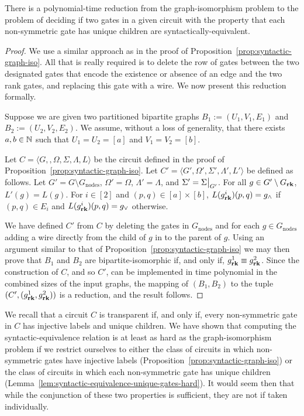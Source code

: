\documentclass[../paper.tex]{subfiles}
\begin{document}
\begin{lem}
  There is a polynomial-time reduction from the graph-isomorphism problem to the
  problem of deciding if two gates in a given circuit with the property that
  each non-symmetric gate has unique children are syntactically-equivalent.
  \label{lem:syntactic-equivalence-unique-gates-hard}
\end{lem}
\begin{proof}
  We use a similar approach as in the proof of
  Proposition~\ref{prop:syntactic-graph-iso}. All that is really required is to
  delete the row of gates between the two designated gates that encode the
  existence or absence of an edge and the two rank gates, and replacing this
  gate with a wire. We now present this reduction formally.
  
  Suppose we are given two partitioned bipartite graphs $B_1 := (U_1, V_1, E_1)$
  and $B_2 := (U_2, V_2, E_2)$. We assume, without a loss of generality, that
  there exists $a, b \in \mathbb{N}$ such that $U_1 = U_2 = [a]$ and $V_1 = V_2 =
  [b]$.

  Let $C = \langle G, , \Omega, \Sigma, \Lambda, L \rangle$ be the circuit
  defined in the proof of Proposition~\ref{prop:syntactic-graph-iso}. Let $C' =
  \langle G', \Omega', \Sigma', \Lambda', L'\rangle$ be defined as follows. Let
  $G' = G \setminus G_{\text{nodes}}$, $\Omega' = \Omega$, $\Lambda' = \Lambda$,
  and $\Sigma' = \restr{\Sigma}{G'}$. For all $g \in G' \setminus G_{\text{\textbf{rk}}}$,
  $L'(g) = L(g)$. For $i \in [2]$ and $(p,q) \in [a] \times [b]$,
  $L(g^i_{\text{\textbf{rk}}})(p,q) = g_{\land}$ if $(p,q) \in E_i$ and $L(g^i_{\text{\textbf{rk}}})(p,q)
  = g_{\lor}$ otherwise.

  We have defined $C'$ from $C$ by deleting the gates in $G_{\text{nodes}}$ and
  for each $g \in G_{\text{nodes}}$ adding a wire directly from the child of $g$
  in to the parent of $g$. Using an argument similar to that of
  Proposition~\ref{prop:syntactic-graph-iso} we may then prove that $B_1$ and
  $B_2$ are bipartite-isomorphic if, and only if, $g^1_{\text{\textbf{rk}}} \equiv
  g^2_{\text{\textbf{rk}}}$. Since the construction of $C$, and so $C'$, can be implemented
  in time polynomial in the combined sizes of the input graphs, the mapping of
  $(B_1, B_2)$ to the tuple $(C', (g^1_{\text{\textbf{rk}}}, g^2_{\text{\textbf{rk}}}))$ is a reduction,
  and the result follows.
\end{proof}

We recall that a circuit $C$ is transparent if, and only if, every non-symmetric
gate in $C$ has injective labels and unique children. We have shown that
computing the syntactic-equivalence relation is at least as hard as the
graph-isomorphism problem if we restrict ourselves to either the class of
circuits in which non-symmetric gates have injective labels
(Proposition~\ref{prop:syntactic-graph-iso}) or the class of circuits in which
each non-symmetric gate has unique children
(Lemma~\ref{lem:syntactic-equivalence-unique-gates-hard}). It would seem then
that while the conjunction of these two properties is sufficient, they are not
if taken individually.
\end{document}

